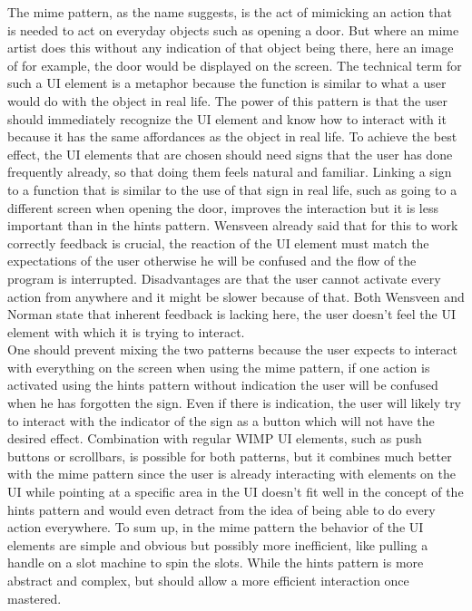 The mime pattern, as the name suggests, is the act of mimicking an action that is needed to act on everyday objects such as opening a door. But where an mime artist does this without any indication of that object being there, here an image of for example, the door would be displayed on the screen. The technical term for such a UI element is a metaphor because the function is similar to what a user would do with the object in real life. The power of this pattern is that the user should immediately recognize the UI element and know how to interact with it because it has the same affordances as the object in real life. To achieve the best effect, the UI elements that are chosen should need signs that the user has done frequently already, so that doing them feels natural and familiar. Linking a sign to a function that is similar to the use of that sign in real life, such as going to a different screen when opening the door, improves the interaction but it is less important than in the hints pattern. Wensveen \cite{Wensveen2004} already said that for this to work correctly feedback is crucial, the reaction of the UI element must match the expectations of the user otherwise he will be confused and the flow of the program is interrupted. Disadvantages are that the user cannot activate every action from anywhere and it might be slower because of that. Both Wensveen \cite{Wensveen2004} and Norman \cite{Norman2010} state that inherent feedback is lacking here, the user doesn't feel the UI element with which it is trying to interact. \\

One should prevent mixing the two patterns because the user expects to interact with everything on the screen when using the mime pattern, if one action is activated using the hints pattern without indication the user will be confused when he has forgotten the sign. Even if there is indication, the user will likely try to interact with the indicator of the sign as a button which will not have the desired effect. Combination with regular WIMP UI elements, such as push buttons or scrollbars, is possible for both patterns, but it combines much better with the mime pattern since the user is already interacting with elements on the UI while pointing at a specific area in the UI doesn't fit well in the concept of the hints pattern and would even detract from the idea of being able to do every action everywhere. To sum up, in the mime pattern the behavior of the UI elements are simple and obvious but possibly more inefficient, like pulling a handle on a slot machine to spin the slots. While the hints pattern is more abstract and complex, but should allow a more efficient interaction once mastered.\\


